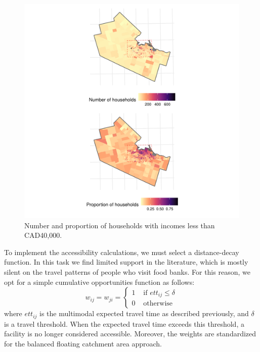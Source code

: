\documentclass[]{elsarticle} %
\begin{document}
\begin{figure}
\includegraphics[width=1\linewidth]{Accessibility-Foodbanks-Hamilton_files/figure-latex/plot-low-income-households-1} \caption{\label{fig:low-income-households}Number and proportion of households with incomes less than CAD40,000.}\label{fig:plot-low-income-households}
\end{figure}

To implement the accessibility calculations, we must select a
distance-decay function. In this task we find limited support in the
literature, which is mostly silent on the travel patterns of people who
visit food banks. For this reason, we opt for a simple cumulative
opportunities function as follows: \[
w_{ij}=w_{ji}=
\begin{cases}
1 & \text{ if } ett_{ij}\le \delta\\
0 & \text{ otherwise}
\end{cases}
\] \noindent where \(ett_{ij}\) is the multimodal expected travel time
as described previously, and \(\delta\) is a travel threshold. When the
expected travel time exceeds this threshold, a facility is no longer
considered accessible. Moreover, the weights are standardized for the
balanced floating catchment area approach.
\end{document}
